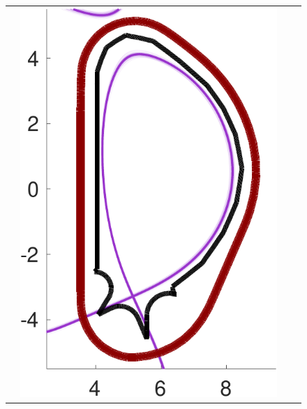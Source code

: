 \documentclass{beamer}
\begin{document}
\begin{frame}[t]
\begin{itemize}[leftmargin=5pt]
\begin{figure}[ht!]
{\begin{tabular}{cccc}
&\includegraphics[width=1\linewidth]{./figures_slides/QoI_MLMC_DirectSolver_Interp2CommonGrid.pdf}

\end{tabular}}
\end{figure}
\end{itemize}
\end{frame}
\end{document}
